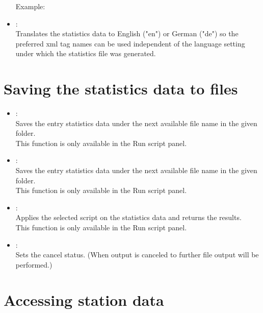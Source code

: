 \begin{itemize}
Example:\\

\item
{}:\\
Translates the statistics data to English ("{}en") or German ("{}de") so the preferred xml tag names can be
used independent of the language setting under which the statistics file was generated.

\end{itemize}

\section{Saving the statistics data to files}

\begin{itemize}

\item
{}:\\
Saves the entry statistics data under the next available file name in the given folder.\\
This function is only available in the Run script panel.

\item
{}:\\
Saves the entry statistics data under the next available file name in the given folder.\\
This function is only available in the Run script panel.

\item
{}:\\
Applies the selected script on the statistics data and returns the results.\\
This function is only available in the Run script panel.

\item
{}:\\
Sets the cancel status. (When output is canceled to further file output will be performed.)

\end{itemize}

\section{Accessing station data}

